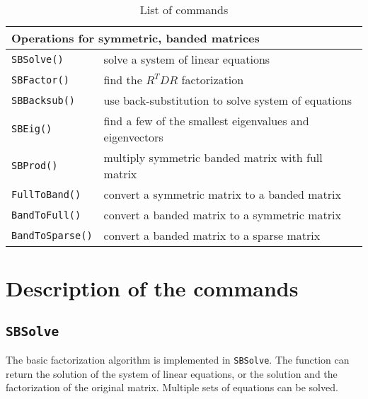 \documentclass[11pt]{article}
\begin{document}
\begin{table}[htbp]
  \begin{center}
\begin{tabular}{|l|l|}\hline
\multicolumn{2}{|l|}{Operations for symmetric, banded matrices}\\\hline
\texttt{SBSolve()} & solve a system of linear equations \\
\texttt{SBFactor()} & find the $R^TDR$ factorization \\
\texttt{SBBacksub()} & use back-substitution to solve system of equations\\
\texttt{SBEig()} & find a few of the smallest eigenvalues and eigenvectors\\
\texttt{SBProd()} & multiply symmetric banded matrix with full matrix\\
\texttt{FullToBand()} & convert a symmetric matrix to a banded matrix\\
\texttt{BandToFull()} & convert a banded matrix to a symmetric matrix\\
\texttt{BandToSparse()} & convert a banded matrix to a sparse matrix\\
\hline\end{tabular}
    \caption{List of commands}
    \label{tab:commands}
  \end{center}
\end{table}
\begin{center}
\end{center}


\section{Description of the commands}
 
\subsection{\texttt{SBSolve}}
The basic factorization algorithm is implemented in \texttt{SBSolve}. The
function can return the solution of the system of linear equations, or the
solution and the factorization of the original matrix.
Multiple sets of equations can be solved.
\end{document}
